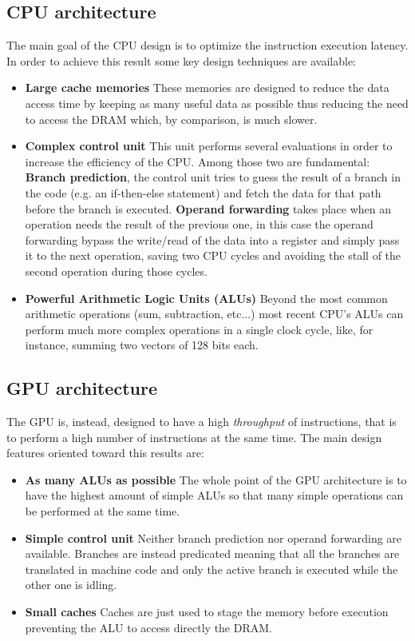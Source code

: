\subsection{CPU architecture}
The main goal of the CPU design is to optimize the instruction execution latency. In order to achieve this result some key design techniques are available:
\begin{itemize}
\item \textbf{Large cache memories} These memories are designed to reduce the data access time by keeping as many useful data as possible thus reducing the need to access the DRAM which, by comparison, is much slower.
\item \textbf{Complex control unit} This unit performs several evaluations in order to increase the efficiency of the CPU. Among those two are fundamental: \textbf{Branch prediction}, the control unit tries to guess the result of a branch in the code (e.g. an if-then-else statement) and fetch the data for that path before the branch is executed. \textbf{Operand forwarding} takes place when an operation needs the result of the previous one, in this case the operand forwarding bypass the write/read of the data into a register and simply pass it to the next operation, saving two CPU cycles and avoiding the stall of the second operation during those cycles.
\item \textbf{Powerful Arithmetic Logic Units (ALUs)} Beyond the most common arithmetic operations (sum, subtraction, etc...) most recent CPU's ALUs can perform much more complex operations in a single clock cycle, like, for instance, summing two vectors of 128 bits each.
\end{itemize}

\subsection{GPU architecture}
The GPU is, instead, designed to have a high \textit{throughput} of instructions, that is to perform a high number of instructions at the same time. The main design features oriented toward this results are:
\begin{itemize}
\item{\textbf{As many ALUs as possible}} The whole point of the GPU architecture is to have the highest amount of simple ALUs so that many simple operations can be performed at the same time.
\item{\textbf{Simple control unit}} Neither branch prediction nor operand forwarding are available. Branches are instead predicated meaning that all the branches are translated in machine code and only the active branch is executed while the other one is idling.
\item{\textbf{Small caches}} Caches are just used to stage the memory before execution preventing the ALU to access directly the DRAM.
\end{itemize}

